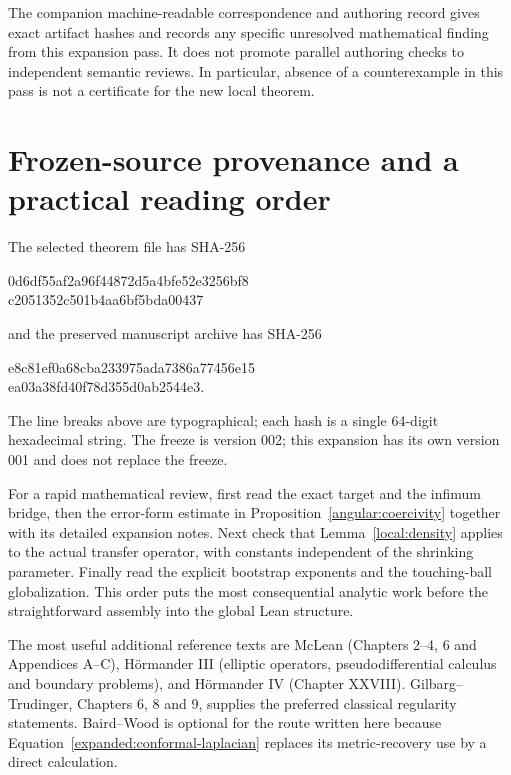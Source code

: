 \documentclass[11pt]{article}
\theoremstyle{definition}
\theoremstyle{remark}
\numberwithin{equation}{section}
\begin{document}
The companion machine-readable correspondence and authoring record gives
exact artifact hashes and records any specific unresolved mathematical
finding from this expansion pass. It does not promote parallel authoring
checks to independent semantic reviews. In particular, absence of a
counterexample in this pass is not a certificate for the new local theorem.

\appendix
\renewcommand{\thesection}{S\arabic{section}}
\renewcommand{\theHsection}{supp.\arabic{section}}
\section{Frozen-source provenance and a practical reading order}
The selected theorem file has SHA-256
\begin{center}\ttfamily\small
0d6df55af2a96f44872d5a4bfe52e3256bf8\\
c2051352c501b4aa6bf5bda00437
\end{center}
and the preserved manuscript archive has SHA-256
\begin{center}\ttfamily\small
e8c81ef0a68cba233975ada7386a77456e15\\
ea03a38fd40f78d355d0ab2544e3.
\end{center}
The line breaks above are typographical; each hash is a single 64-digit
hexadecimal string. The freeze is version 002; this expansion has its
own version 001 and does not replace the freeze.

For a rapid mathematical review, first read the exact target and the
infimum bridge, then the error-form estimate in
Proposition~\ref{angular:coercivity} together with its detailed expansion
notes. Next check that Lemma~\ref{local:density} applies to the actual
transfer operator, with constants independent of the shrinking parameter.
Finally read the explicit bootstrap exponents and the touching-ball
globalization. This order puts the most consequential analytic work
before the straightforward assembly into the global Lean structure.

The most useful additional reference texts are McLean (Chapters 2--4,
6 and Appendices A--C), H\"ormander III (elliptic operators,
pseudodifferential calculus and boundary problems), and H\"ormander IV
(Chapter XXVIII). Gilbarg--Trudinger, Chapters 6, 8 and 9, supplies the
preferred classical regularity statements. Baird--Wood is optional for
the route written here because Equation~\eqref{expanded:conformal-laplacian}
replaces its metric-recovery use by a direct calculation.
\end{document}
